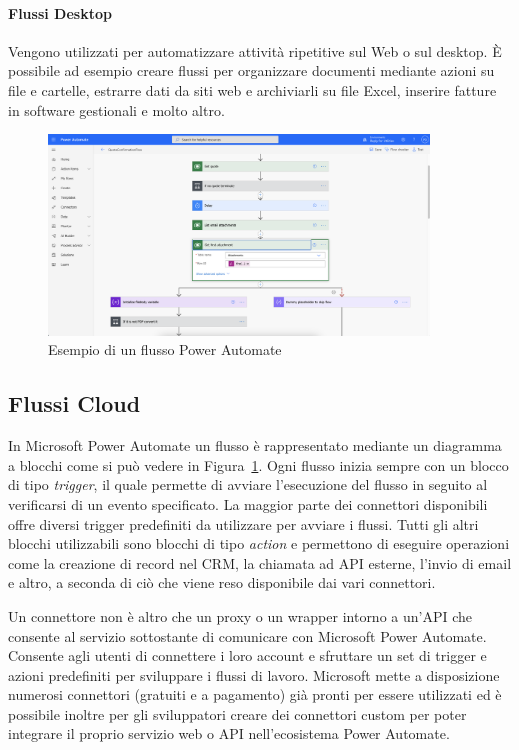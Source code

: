 \paragraph{Flussi Desktop} Vengono utilizzati per automatizzare attività ripetitive sul Web o sul desktop. È possibile ad esempio creare flussi per organizzare documenti mediante azioni su file e cartelle, estrarre dati da siti web e archiviarli su file Excel, inserire fatture in software gestionali e molto altro.~\cite{FlussiPowerAutomate}

\begin{figure}[ht!]
  \centering
  \includegraphics[width=0.9\textwidth]{flow-example.png}
  \caption{Esempio di un flusso Power Automate}
  \label{fig:flowExample}
\end{figure}

\subsection{Flussi Cloud}
In Microsoft Power Automate un flusso è rappresentato mediante un diagramma a blocchi come si può vedere in Figura~\ref{fig:flowExample}. Ogni flusso inizia sempre con un blocco di tipo \textit{trigger}, il quale permette di avviare l'esecuzione del flusso in seguito al verificarsi di un evento specificato. La maggior parte dei connettori disponibili offre diversi trigger predefiniti da utilizzare per avviare i flussi. Tutti gli altri blocchi utilizzabili sono blocchi di tipo \textit{action} e permettono di eseguire operazioni come la creazione di record nel CRM, la chiamata ad API esterne, l'invio di email e altro, a seconda di ciò che viene reso disponibile dai vari connettori.

Un connettore non è altro che un proxy o un wrapper intorno a un'API che consente al servizio sottostante di comunicare con Microsoft Power Automate. Consente agli utenti di connettere i loro account e sfruttare un set di trigger e azioni predefiniti per sviluppare i flussi di lavoro. Microsoft mette a disposizione numerosi connettori (gratuiti e a pagamento) già pronti per essere utilizzati ed è possibile inoltre per gli sviluppatori creare dei connettori custom per poter integrare il proprio servizio web o API nell'ecosistema Power Automate.~\cite{ConnettoriPowerAutomate}

